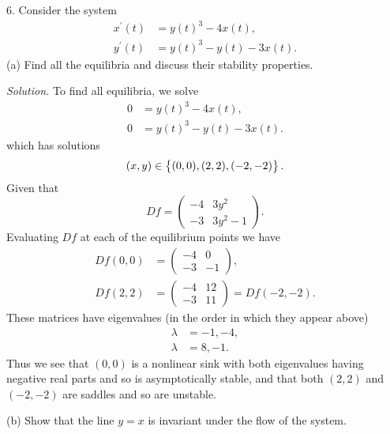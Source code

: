 \documentclass{article}
\begin{document}
\newpage

6. Consider the system
%
\begin{align*}
    x^\prime(t) &= y(t)^3 - 4 x(t), \\
    y^\prime(t) &= y(t)^3 - y(t) - 3 x(t).
\end{align*}
%
(a) Find all the equilibria and discuss their stability properties.

\textit{Solution.}
To find all equilibria, we solve
%
\begin{align*}
    0 &= y(t)^3 - 4 x(t), \\
    0 &= y(t)^3 - y(t) - 3 x(t).
\end{align*}
%
which has solutions
%
\begin{equation*}
    (x, y) \in \cbr{(0, 0), (2, 2), (-2, -2)}
    .
\end{equation*}
%
Given that
%
\begin{equation*}
    Df =
    \begin{pmatrix}
        -4 & 3 y^2 \\
        -3 & 3 y^2 - 1
    \end{pmatrix}
    .
\end{equation*}
%
Evaluating $Df$ at each of the equilibrium points we have
%
\begin{align*}
    Df(0, 0) &=
    \begin{pmatrix}
        -4 & 0 \\
        -3 & -1
    \end{pmatrix}
    ,
    \\
    Df(2, 2) &=
    \begin{pmatrix}
        -4 & 12 \\
        -3 & 11
    \end{pmatrix}
    = Df(-2, -2)
    .
\end{align*}
%
These matrices have eigenvalues (in the order in which they appear above)
%
\begin{align*}
    \lambda &= -1, -4, \\
    \lambda &= 8, -1
    .
\end{align*}
%
Thus we see that $(0, 0)$ is a nonlinear sink with both eigenvalues having
negative real parts and so is asymptotically stable, and that both
$(2, 2)$ and $(-2, -2)$ are saddles and so are unstable.

\vspace{5mm}

(b) Show that the line $y = x$ is invariant under the flow of the system.
\end{document}
